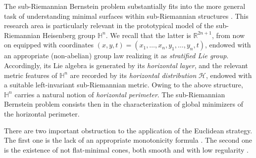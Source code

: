 \documentclass[11pt]{amsart}
\newcommand{\hhh}{{\mathcal{H}}}
\newcommand{\hn}{\mathbb{H}^n}
\newcommand{\rr}{{\mathbb{R}}}
\newcommand{\hh}{{\mathbb{H}}}
\theoremstyle{definition}
\theoremstyle{remark}
\numberwithin{equation}{section}
\begin{document}
\medskip
The sub-Riemannian Bernstein problem substantially fits into the more general task of understanding minimal surfaces within sub-Riemannian structures \cite{MR2165405,MR2983199,MR2262784,MR2472175,MR4346009,pmc1,MR4314055,SGR,MR2043961,MR3445204,MR5029815,MR2448649,MR3276118}. This research area is particularly relevant in the prototypical model of the sub-Riemannian Heisenberg group $\hn$. 
We recall that the latter is $\mathbb R^{2n+1}$, from now on equipped with coordinates $(x,y,t)=(x_1,\ldots,x_n,y_1,\ldots,y_n,t)$, endowed with an appropriate (non-abelian) group law
realizing it as \emph{stratified Lie group}. Accordingly, its Lie algebra is generated by its \emph{horizontal layer}, and the relevant metric features of $\hh^n$ are recorded by its \emph{horizontal distribution} $\hhh$, endowed with a suitable left-invariant sub-Riemannian metric.   
Owing to the above structure, $\hh^n$ carries a natural notion of \emph{horizontal perimeter}. The sub-Riemannian Bernstein problem consists then in the characterization of global minimizers of the horizontal perimeter.  %

\medskip
There are two important obstruction to the application of the Euclidean strategy.
The first one is the lack of an appropriate monotonicity formula \cite{MR2644313}. 
The second one is the existence of not flat-minimal cones, both smooth  \cite{MR2983199,SGR,MR2435652} and with low regularity \cite{MR2455341,MR2448649}.
\end{document}
